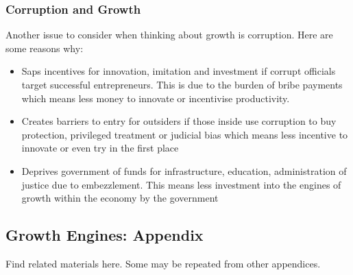 \documentclass[12pt, letterpaper]{article}
\begin{document}
\subsubsection{Corruption and Growth}
Another issue to consider when thinking about growth is corruption. Here are some reasons why:
\begin{itemize}
	\item Saps incentives for innovation, imitation and investment if corrupt officials target successful entrepreneurs. This is due to the burden of bribe payments which means less money to innovate or incentivise productivity.
	\item Creates barriers to entry for outsiders if those inside use corruption to buy protection, privileged treatment or judicial bias which means less incentive to innovate or even try in the first place
	\item Deprives government of funds for infrastructure, education, administration of justice due to embezzlement. This means less investment into the engines of growth within the economy by the government
\end{itemize}

\subsection{Growth Engines: Appendix}
Find related materials here. Some may be repeated from other appendices.
\end{document}
